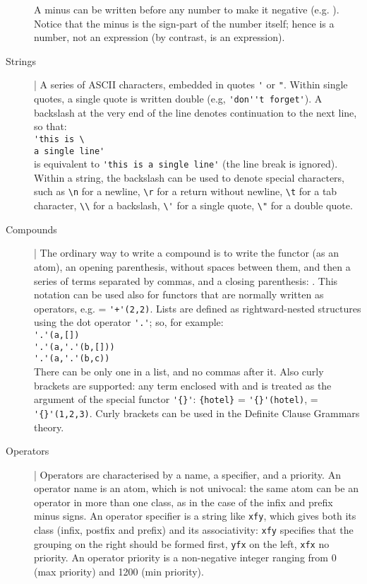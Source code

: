 \begin{description}
%
A minus can be written before any number to make it negative (e.g. ).
%
Notice that the minus is the sign-part of the number itself; hence  is a number, not an expression (by contrast,  is an expression).
%
\item[Strings] |
A series of ASCII characters, embedded in quotes \verb|'| or \verb|"|.
%
Within single quotes, a single quote is written double (e.g, \verb|'don''t forget'|).
%
A backslash at the very end of the line denotes continuation to the next line, so that: \\
\verb|'this is \ |\\
\verb|a single line'|\\
is equivalent to \verb|'this is a single line'| (the line break is ignored).
%
Within a string, the backslash can be used to denote special characters, such as \verb|\n| for a newline,
\verb|\r| for a return without newline,
\verb|\t| for a tab character,
\verb|\\| for a backslash,
\verb|\'| for a single quote,
\verb|\"| for a double quote.
%
\item[Compounds] |
The ordinary way to write a compound is to write the functor (as an atom), an opening parenthesis, without spaces between them, and then a series of terms separated by commas, and a closing parenthesis: .
%
This notation can be used also for functors that are normally written as operators, e.g.  = \verb|'+'(2,2)|.
%
Lists are defined as rightward-nested structures using the dot operator \verb|'.'|; so, for example: \\
\bt{[a] =} \verb|'.'(a,[])|\\
\bt{[a,b] =} \verb|'.'(a,'.'(b,[]))|\\
\bt{[a,b|c] =} \verb|'.'(a,'.'(b,c))|\\
%
There can be only one \bt{|} in a list, and no commas after it.
%
Also curly brackets are supported: any term enclosed with \bt{$\{$} and \bt{$\}$} is treated as the argument of the special functor \verb|'{}'|:  \verb|{hotel}| = \verb|'{}'(hotel)|,  = \verb|'{}'(1,2,3)|.
%
Curly brackets can be used in the Definite Clause Grammars theory.

\item[Operators] |
Operators are characterised by a name, a specifier, and a priority.
%
An operator name is an atom, which is not univocal: the same atom can be an operator in more than one class, as in the case of the infix and prefix minus signs.
%
An operator  specifier is a string like \texttt{xfy}, which gives both its class (infix, postfix and prefix) and its associativity: \texttt{xfy} specifies that the grouping on the right should be formed first, \texttt{yfx} on the left, \texttt{xfx} no priority.
%
An operator priority is a non-negative integer ranging from 0 (max priority) and 1200 (min priority).


\end{description}
